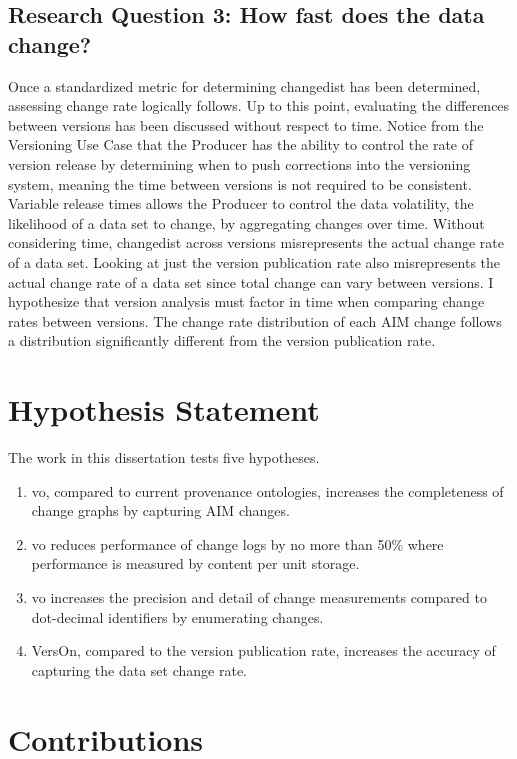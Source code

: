 \subsection{Research Question 3: How fast does the data change?}

Once a standardized metric for determining \gls{changedist} has been determined, assessing change rate logically follows.
Up to this point, evaluating the differences between versions has been discussed without respect to time.
Notice from the Versioning Use Case that the Producer has the ability to control the rate of version release by determining when to push corrections into the versioning system, meaning the time between \glspl{version} is not required to be consistent.
Variable release times allows the Producer to control the data volatility, the likelihood of a data set to change, by aggregating changes over time.
Without considering time, \gls{changedist} across \glspl{version} misrepresents the actual change rate of a data set.
Looking at just the version publication rate also misrepresents the actual change rate of a data set since total change can vary between \glspl{version}.
I hypothesize that version analysis must factor in time when comparing change rates between \glspl{version}.
The change rate distribution of each \gls{AIM} \gls{change} follows a distribution significantly different from the version publication rate.

\section{Hypothesis Statement}

The work in this dissertation tests five hypotheses.
\begin{enumerate}
	\item \gls{vo}, compared to current provenance ontologies, increases the completeness of change graphs by capturing \gls{AIM} changes.
	\item \gls{vo} reduces performance of change logs by no more than 50\% where performance is measured by content per unit storage.
	\item \gls{vo} increases the precision and detail of change measurements compared to dot-decimal identifiers by enumerating changes.
	\item VersOn, compared to the version publication rate, increases the accuracy of capturing the data set change rate.
\end{enumerate}

\section{Contributions}

